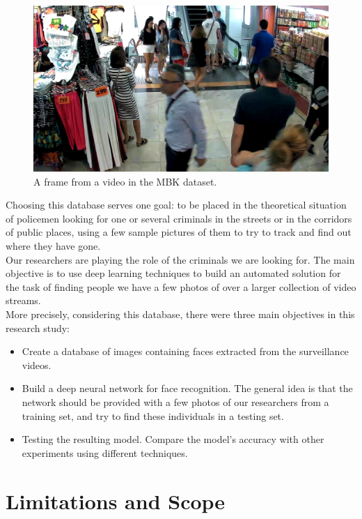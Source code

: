 \begin{figure}[t]
  \centering
  \includegraphics[scale=0.3]{figures/database.png}  
  \caption[A frame from a video in the MBK dataset.]{A frame from a video in the MBK dataset.}
  \label{fig:example}
\end{figure}

Choosing this database serves one goal: to be placed in the theoretical situation of policemen looking for one or several criminals in the streets or in the corridors of public places, using a few sample pictures of them to try to track and find out where they have gone.\\

Our researchers are playing the role of the criminals we are looking for.
The main objective is to use deep learning techniques to build an automated solution for the task of finding people we have a few photos of over a larger collection of video streams.\\

More precisely, considering this database, there were three main objectives in this research study:
\begin{itemize}
\item Create a database of images containing faces extracted from the surveillance videos.
\item Build a deep neural network for face recognition. The general idea is that the network should be provided with a few photos of our researchers from a training set, and try to find these individuals in a testing set.
\item Testing the resulting model. Compare the model's accuracy with other experiments using different techniques.
\end{itemize}

\section{Limitations and Scope}

